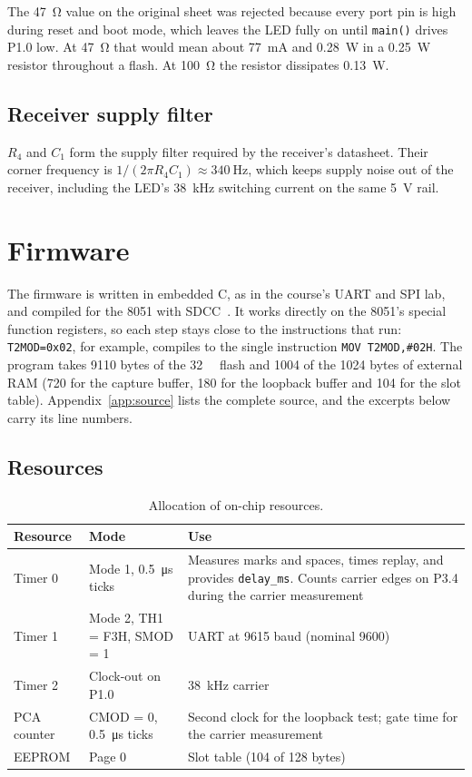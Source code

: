 \documentclass[11pt,a4paper]{article}
\newcommand{\code}[1]{\texttt{#1}}
\begin{document}
The \qty{47}{\ohm} value on the original sheet was rejected because every port pin is high during reset and boot mode, which leaves the LED fully on until \code{main()} drives P1.0 low. At \qty{47}{\ohm} that would mean about \qty{77}{\milli\ampere} and \qty{0.28}{\watt} in a \qty{0.25}{\watt} resistor throughout a flash. At \qty{100}{\ohm} the resistor dissipates \qty{0.13}{\watt}.

\subsection{Receiver supply filter}

$R_4$ and $C_1$ form the supply filter required by the receiver's datasheet. Their corner frequency is $1/(2\pi R_4 C_1) \approx \qty{340}{\hertz}$, which keeps supply noise out of the receiver, including the LED's \qty{38}{\kilo\hertz} switching current on the same \qty{5}{\volt} rail.

\section{Firmware}

The firmware is written in embedded C, as in the course's UART and SPI lab, and compiled for the 8051 with SDCC~\cite{sdcc}. It works directly on the 8051's special function registers, so each step stays close to the instructions that run: \code{T2MOD=0x02}, for example, compiles to the single instruction \code{MOV T2MOD,\#02H}. The program takes \num{9110} bytes of the \qty{32}{\kilo\byte} flash and \num{1004} of the \num{1024} bytes of external RAM (\num{720} for the capture buffer, 180 for the loopback buffer and 104 for the slot table). Appendix~\ref{app:source} lists the complete source, and the excerpts below carry its line numbers.

\subsection{Resources}

\begin{table}[H]
\centering
\caption{Allocation of on-chip resources.}
\label{tab:res}
\begin{tabularx}{\textwidth}{llL}
\toprule
Resource & Mode & Use\\
\midrule
Timer 0 & Mode 1, \qty{0.5}{\micro\second} ticks & Measures marks and spaces, times replay, and provides \code{delay\_ms}. Counts carrier edges on P3.4 during the carrier measurement\\
Timer 1 & Mode 2, TH1 = F3H, SMOD = 1 & UART at 9615 baud (nominal 9600)\\
Timer 2 & Clock-out on P1.0 & \qty{38}{\kilo\hertz} carrier\\
PCA counter & CMOD = 0, \qty{0.5}{\micro\second} ticks & Second clock for the loopback test; gate time for the carrier measurement\\
EEPROM & Page 0 & Slot table (104 of 128 bytes)\\
\bottomrule
\end{tabularx}
\end{table}
\end{document}
